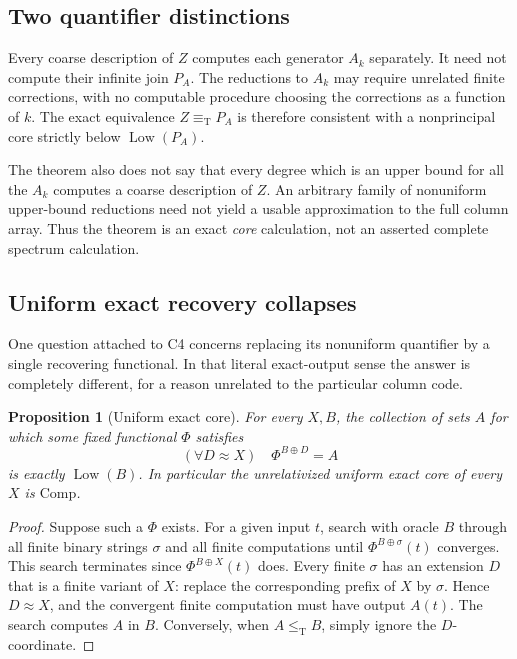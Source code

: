 \documentclass[11pt,letterpaper]{article}
\theoremstyle{plain}
\newtheorem{proposition}[theorem]{Proposition}
\theoremstyle{definition}
\theoremstyle{remark}
\numberwithin{equation}{section}
\newcommand{\leT}{\leq_{\mathrm T}}
\newcommand{\eqT}{\equiv_{\mathrm T}}
\newcommand{\Low}{\operatorname{Low}}
\newcommand{\Comp}{\mathrm{Comp}}
\newcommand{\join}{\mathbin{\oplus}}
\begin{document}
\subsection{Two quantifier distinctions}\label{cr11:sec:quantifiers}

Every coarse description of $Z$ computes each generator $A_k$ separately.
It need not compute their infinite join $P_A$. The reductions to $A_k$ may
require unrelated finite corrections, with no computable procedure choosing
the corrections as a function of $k$. The exact equivalence $Z\eqT P_A$
is therefore consistent with a nonprincipal core strictly below $\Low(P_A)$.

The theorem also does not say that every degree which is an upper bound for
all the $A_k$ computes a coarse description of $Z$. An arbitrary family of
nonuniform upper-bound reductions need not yield a usable approximation to
the full column array. Thus the theorem is an exact \emph{core}
calculation, not an asserted complete spectrum calculation.

\subsection{Uniform exact recovery collapses}

One question attached to C4 concerns replacing its nonuniform quantifier by
a single recovering functional. In that literal exact-output sense the
answer is completely different, for a reason unrelated to the particular
column code.

\begin{proposition}[Uniform exact core]\label{cr11:prop:uniformcore}
For every $X,B$, the collection of sets $A$ for which some fixed functional
$\Phi$ satisfies
\[
                  (\forall D\approx X)\quad\Phi^{B\join D}=A
\]
is exactly $\Low(B)$. In particular the unrelativized uniform exact core of
every $X$ is $\Comp$.
\end{proposition}
\begin{proof}
Suppose such a $\Phi$ exists. For a given input $t$, search with oracle $B$
through all finite binary strings $\sigma$ and all finite computations until
$\Phi^{B\join\sigma}(t)$ converges. This search terminates since
$\Phi^{B\join X}(t)$ does. Every finite $\sigma$ has an extension $D$ that
is a finite variant of $X$: replace the corresponding prefix of $X$ by
$\sigma$. Hence $D\approx X$, and the convergent finite computation must
have output $A(t)$. The search computes $A$ in $B$. Conversely, when
$A\leT B$, simply ignore the $D$-coordinate.
\end{proof}
\end{document}
